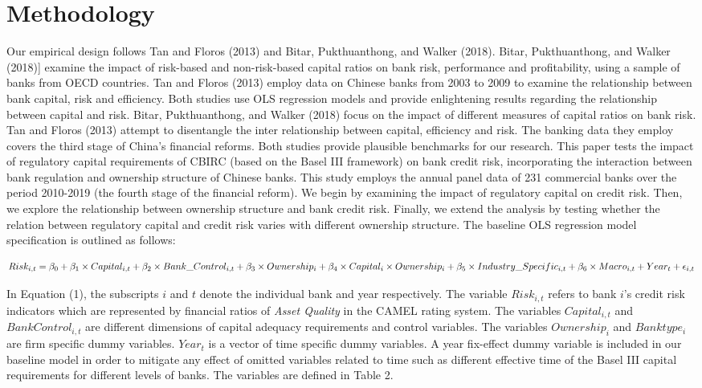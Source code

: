 \documentclass{article}
\begin{document}
\hypertarget{methodology}{%
\section{Methodology}\label{methodology}}

Our empirical design follows Tan and Floros (2013) and Bitar,
Pukthuanthong, and Walker (2018). Bitar, Pukthuanthong, and Walker
(2018){]} examine the impact of risk-based and non-risk-based capital
ratios on bank risk, performance and profitability, using a sample of
banks from OECD countries. Tan and Floros (2013) employ data on Chinese
banks from 2003 to 2009 to examine the relationship between bank
capital, risk and efficiency. Both studies use OLS regression models and
provide enlightening results regarding the relationship between capital
and risk. Bitar, Pukthuanthong, and Walker (2018) focus on the impact of
different measures of capital ratios on bank risk. Tan and Floros (2013)
attempt to disentangle the inter relationship between capital,
efficiency and risk. The banking data they employ covers the third stage
of China's financial reforms. Both studies provide plausible benchmarks
for our research. This paper tests the impact of regulatory capital
requirements of CBIRC (based on the Basel III framework) on bank credit
risk, incorporating the interaction between bank regulation and
ownership structure of Chinese banks. This study employs the annual
panel data of 231 commercial banks over the period 2010-2019 (the fourth
stage of the financial reform). We begin by examining the impact of
regulatory capital on credit risk. Then, we explore the relationship
between ownership structure and bank credit risk. Finally, we extend the
analysis by testing whether the relation between regulatory capital and
credit risk varies with different ownership structure. The baseline OLS
regression model specification is outlined as follows:

\begin{equation}
Risk_{i, t} = \beta_0 + \beta_1 \times Capital_{i, t} + \beta_2 \times Bank\_Control_{i, t} + \beta_3 \times Ownership_i + \\
\beta_4 \times Capital_i \times Ownership_i + \beta_5 \times Industry\_Specific_{i,t}  + \beta_6 \times Macro_{i,t} + Year_t + \epsilon_{i,t}
\end{equation}

In Equation (1), the subscripts \(i\) and \(t\) denote the individual
bank and year respectively. The variable \(Risk_{i,t}\) refers to bank
\(i\)'s credit risk indicators which are represented by financial ratios
of \emph{Asset Quality} in the CAMEL rating system. The variables
\(Capital_{i,t}\) and \(BankControl_{i,t}\) are different dimensions of
capital adequacy requirements and control variables. The variables
\(Ownership_i\) and \(Banktype_i\) are firm specific dummy variables.
\(Year_t\) is a vector of time specific dummy variables. A year
fix-effect dummy variable is included in our baseline model in order to
mitigate any effect of omitted variables related to time such as
different effective time of the Basel III capital requirements for
different levels of banks. The variables are defined in Table 2.
\end{document}
